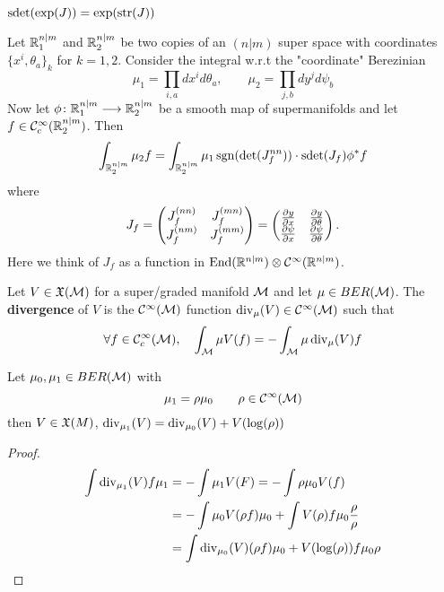 \begin{rem}
  \begin{corollary}
    $\operatorname{sdet}(\exp(J)) = \exp(\operatorname{str}(J))$
  \end{corollary}

  \begin{theo}
    Let $\mathbb{R}^{n|m}_1$ and $\mathbb{R}^{n|m}_2$ be two copies of an $(n|m)$ super space with coordinates $\{x^i, \theta_a\}_k$ for $k = 1,2$. Consider the integral w.r.t the "coordinate" Berezinian
    \begin{equation}
      \mu_1 = \prod_{i,a} dx^i d\theta_a, \quad \quad \mu_2 = \prod_{j,b} dy^j d\psi_b
    \end{equation}
    Now let $\phi \colon \RR^{n|m}_1 \lra \RR^{n|m}_2$ be a smooth map of supermanifolds and let $f \in \mathcal{C}^{\infty}_c(\mathbb{R}^{n|m}_2)$. Then
    \begin{equation}\int_{\RR^{n|m}_2} \mu_2 f = \int_{\RR^{n|m}_2} \mu_1 \sgn(\det(J_f^{nn})) \cdot \sdet(J_f) \phi^* f \end{equation}
    where
    \begin{align}
    J_f =
    \begin{pmatrix}
      J_f^{(nn)} & J_f^{(mn)} \\
      J_f^{(nm)} & J_f^{(mm)}
    \end{pmatrix} =
    \begin{pmatrix}
      \frac{\partial y}{\partial x} & \frac{\partial y}{\partial \theta} \\
      \frac{\partial \psi}{\partial x} & \frac{\partial \psi}{\partial \theta}
    \end{pmatrix}.
    \end{align}
    Here we think of $J_f$ as a function in $\operatorname{End}(\mathbb{R}^{n|m}) \otimes \mathcal{C}^{\infty}(\mathbb{R}^{n|m})$.
  \end{theo}

  \begin{definition}
    Let $V \in \mathfrak{X}(\mathcal{M})$ for a super/graded manifold $\mathcal{M}$ and let $\mu \in BER(\mathcal{M})$. The \textbf{divergence} of $V$ is the $\mathcal{C}^{\infty}(\mathcal{M})$ function $\operatorname{div}_\mu(V) \in \mathcal{C}^{\infty}(\mathcal{M})$ such that
    \begin{equation}\forall f \in \mathcal{C}^{\infty}_c(\mathcal{M}), \quad \int_{\mathcal{M}} \mu V(f) = - \int_{\mathcal{M}} \mu \operatorname{div}_\mu(V) f\end{equation}
  \end{definition}

  \begin{lem}
    Let $\mu_0, \mu_1 \in BER(\mathcal{M})$ with
    \begin{equation}\mu_1 = \rho \mu_0 \quad \quad  \rho \in \mathcal{C}^{\infty}(\mathcal{M}) \end{equation}
    then $V \in \mathfrak{X}(M)$, $\operatorname{div}_{\mu_1}(V) = \operatorname{div}_{\mu_0}(V) + V(\log(\rho))$
  \begin{proof}~
    \begin{align}
      \int \operatorname{div}_{\mu_1}(V) f\mu_1 &= -\int \mu_1 V(F) = - \int \rho \mu_0 V(f)\\
      &= - \int \mu_0 V(\rho f) \mu_0 + \int V(\rho) f \mu_0 \frac{\rho}{\rho} \\
      &= \int \operatorname{div}_{\mu_0} (V) (\rho f) \mu_0 + V(\log(\rho)) f \mu_0 \rho
    \end{align}
  \end{proof}
  \end{lem}


\end{rem}
